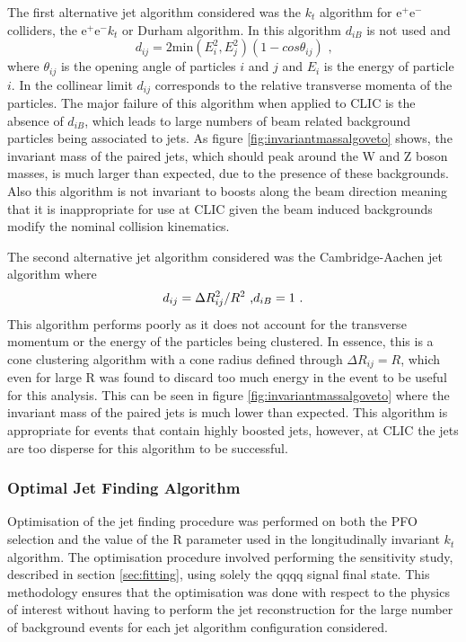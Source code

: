The first alternative jet algorithm considered was the $k_{t}$ algorithm for $\text{e}^{+}\text{e}^{-}$ colliders, the $\text{e}^{+}\text{e}^{-}k_{t}$  or Durham algorithm.  In this algorithm $d_{iB}$ is not used and 
%
\begin{equation}
d_{ij} = 2\text{min}(E_{i}^{2}, E_{j}^{2})(1-cos\theta_{ij}) \text{ ,}
\end{equation}
%
\noindent where $\theta_{ij}$ is the opening angle of particles $i$ and $j$ and $E_{i}$ is the energy of particle $i$.  In the collinear limit $d_{ij}$ corresponds to the relative transverse momenta of the particles.  The major failure of this algorithm when applied to CLIC is the absence of $d_{iB}$, which leads to large numbers of beam related background particles being associated to jets.  As figure \ref{fig:invariantmassalgoveto} shows, the invariant mass of the paired jets, which should peak around the W and Z boson masses, is much larger than expected, due to the presence of these backgrounds.  Also this algorithm is not invariant to boosts along the beam direction meaning that it is inappropriate for use at CLIC given the beam induced backgrounds modify the nominal collision kinematics.  

The second alternative jet algorithm considered was the Cambridge-Aachen jet algorithm where 
%
\begin{equation}
d_{ij} = {\Delta}R_{ij}^{2}/R^2 \text{ ,} \\
d_{iB} = 1 \text{ .}
\end{equation}
%
\noindent This algorithm performs poorly as it does not account for the transverse momentum or the energy of the particles being clustered. In essence, this is a cone clustering algorithm with a cone radius defined through ${\Delta}R_{ij} = R$, which even for large R was found to discard too much energy in the event to be useful for this analysis.  This can be seen in figure \ref{fig:invariantmassalgoveto} where the invariant mass of the paired jets is much lower than expected.  This algorithm is appropriate for events that contain highly boosted jets, however, at CLIC the jets are too disperse for this algorithm to be successful.


\subsubsection{Optimal Jet Finding Algorithm}
\label{sec:optimaljetalgorithm}
Optimisation of the jet finding procedure was performed on both the PFO selection and the value of the R parameter used in the longitudinally invariant $k_{t}$ algorithm.  The optimisation procedure involved performing the sensitivity study, described in section \ref{sec:fitting}, using solely the {\nu}{\nu}qqqq signal final state.  This methodology ensures that the optimisation was done with respect to the physics of interest without having to perform the jet reconstruction for the large number of background events for each jet algorithm configuration considered. 

